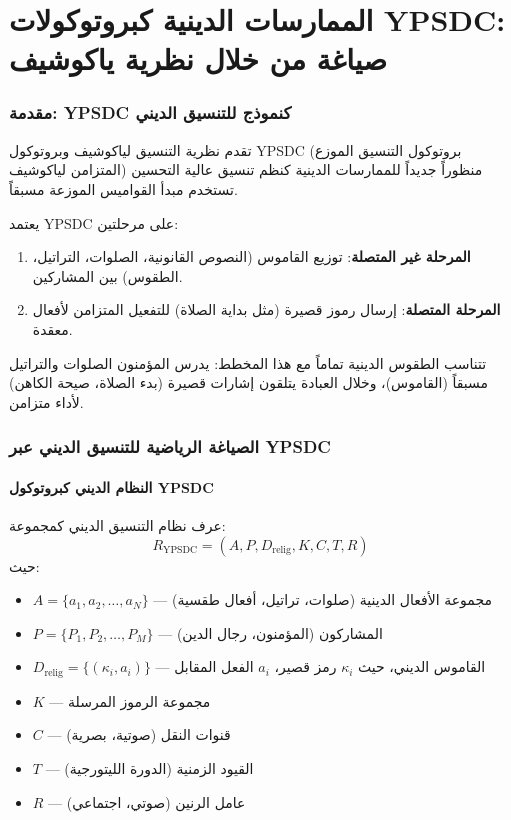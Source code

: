\documentclass[12pt,a4paper]{article}
\begin{document}
	\tableofcontents
	
	\newpage
	
	\part{الممارسات الدينية كبروتوكولات YPSDC: صياغة من خلال نظرية ياكوشيف}
	
	\section{مقدمة: YPSDC كنموذج للتنسيق الديني}
	
	تقدم نظرية التنسيق لياكوشيف وبروتوكول YPSDC (بروتوكول التنسيق الموزع المتزامن لياكوشيف) منظوراً جديداً للممارسات الدينية كنظم تنسيق عالية التحسين تستخدم مبدأ القواميس الموزعة مسبقاً.
	
	يعتمد YPSDC على مرحلتين:
	\begin{enumerate}
		\item \textbf{المرحلة غير المتصلة}: توزيع القاموس (النصوص القانونية، الصلوات، التراتيل، الطقوس) بين المشاركين.
		\item \textbf{المرحلة المتصلة}: إرسال رموز قصيرة (مثل بداية الصلاة) للتفعيل المتزامن لأفعال معقدة.
	\end{enumerate}
	
	تتناسب الطقوس الدينية تماماً مع هذا المخطط: يدرس المؤمنون الصلوات والتراتيل مسبقاً (القاموس)، وخلال العبادة يتلقون إشارات قصيرة (بدء الصلاة، صيحة الكاهن) لأداء متزامن.
	
	\section{الصياغة الرياضية للتنسيق الديني عبر YPSDC}
	
	\subsection{النظام الديني كبروتوكول YPSDC}
	
	عرف نظام التنسيق الديني كمجموعة:
	\[
	R_{\mathrm{YPSDC}} = (A, P, D_{\mathrm{relig}}, K, C, T, R)
	\]
	حيث:
	\begin{itemize}
		\item $A = \{a_1, a_2, \ldots, a_N\}$ — مجموعة الأفعال الدينية (صلوات، تراتيل، أفعال طقسية)
		\item $P = \{P_1, P_2, \ldots, P_M\}$ — المشاركون (المؤمنون، رجال الدين)
		\item $D_{\mathrm{relig}} = \{(\kappa_i, a_i)\}$ — القاموس الديني، حيث $\kappa_i$ رمز قصير، $a_i$ الفعل المقابل
		\item $K$ — مجموعة الرموز المرسلة
		\item $C$ — قنوات النقل (صوتية، بصرية)
		\item $T$ — القيود الزمنية (الدورة الليتورجية)
		\item $R$ — عامل الرنين (صوتي، اجتماعي)
	\end{itemize}
	
\end{document}
